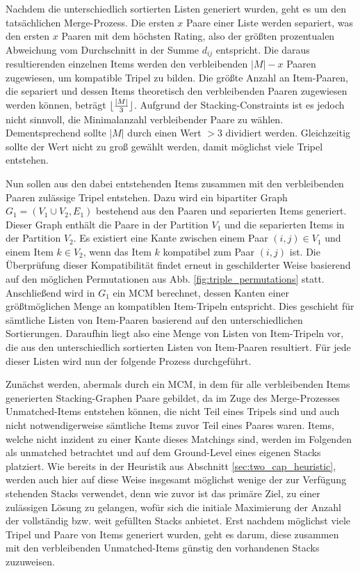 Nachdem die unterschiedlich sortierten Listen generiert wurden, geht es um den tatsächlichen Merge-Prozess.
Die ersten $x$ Paare einer Liste werden separiert, was den ersten $x$ Paaren mit dem höchsten Rating, also der größten
prozentualen Abweichung vom Durchschnitt in der Summe $d_{ij}$ entspricht. Die daraus resultierenden einzelnen Items werden den verbleibenden $|M| - x$ Paaren zugewiesen, um kompatible Tripel zu bilden. Die größte Anzahl an Item-Paaren, die separiert und dessen Items theoretisch den verbleibenden Paaren zugewiesen werden können, beträgt $\lfloor\frac{|M|}{3}\rfloor$. Aufgrund der Stacking-Constraints ist es jedoch nicht sinnvoll, die Minimalanzahl verbleibender Paare zu wählen. Dementsprechend sollte $|M|$ durch einen Wert $> 3$ dividiert werden. Gleichzeitig sollte der Wert nicht zu groß gewählt werden, damit möglichst viele Tripel entstehen.

Nun sollen aus den dabei entstehenden Items zusammen mit den verbleibenden Paaren zulässige Tripel entstehen.
Dazu wird ein bipartiter Graph $G_1 = (V_1 \cup V_2, E_1)$ bestehend aus den Paaren und separierten Items generiert.
Dieser Graph enthält die Paare in der Partition $V_1$ und die separierten Items in der Partition $V_2$.
Es existiert eine Kante zwischen einem Paar $(i, j) \in V_1$ und einem Item $k \in V_2$, wenn das Item $k$ kompatibel zum Paar
$(i, j)$ ist. Die Überprüfung dieser Kompatibilität findet erneut in geschilderter Weise basierend auf den möglichen Permutationen
aus Abb. \ref{fig:triple_permutations} statt.
Anschließend wird in $G_1$ ein \textsc{MCM} berechnet, dessen Kanten einer größtmöglichen Menge an kompatiblen Item-Tripeln entspricht. Dies geschieht für sämtliche Listen von Item-Paaren basierend auf den unterschiedlichen Sortierungen.
Daraufhin liegt also eine Menge von Listen von Item-Tripeln vor, die aus den unterschiedlich sortierten Listen von Item-Paaren resultiert. Für jede dieser Listen wird nun der folgende Prozess durchgeführt.

Zunächst werden, abermals durch ein \textsc{MCM}, in dem für alle verbleibenden Items generierten Stacking-Graphen
Paare gebildet, da im Zuge des Merge-Prozesses Unmatched-Items entstehen können, die nicht Teil eines Tripels sind und auch nicht notwendigerweise sämtliche Items zuvor Teil eines Paares waren. Items, welche nicht inzident zu einer Kante dieses Matchings sind, werden im Folgenden als unmatched betrachtet und auf dem Ground-Level eines eigenen Stacks platziert.
Wie bereits in der Heuristik aus Abschnitt \ref{sec:two_cap_heuristic}, werden auch hier auf diese Weise insgesamt möglichst wenige der zur Verfügung stehenden Stacks verwendet, denn wie zuvor ist das primäre Ziel, zu einer zulässigen Lösung zu gelangen, wofür sich die initiale Maximierung der Anzahl der vollständig bzw. weit gefüllten Stacks anbietet. Erst nachdem möglichst viele Tripel und Paare von Items generiert wurden, geht es darum, diese zusammen mit den verbleibenden Unmatched-Items günstig den vorhandenen Stacks zuzuweisen.

